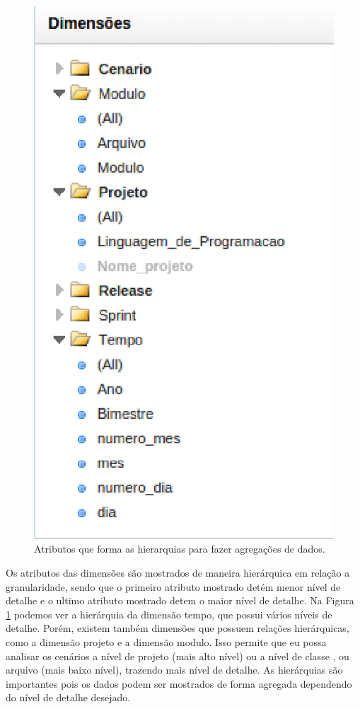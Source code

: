 \begin{figure}[H]
	\centering
	\includegraphics[scale=0.6]{figuras/dw-hierarquias}
	\caption{Atributos que forma as hierarquias para fazer agregações de dados.}
	\label{dw-hierarquias}
\end{figure}

Os atributos das dimensões são mostrados de maneira hierárquica em relação a granularidade, sendo que o primeiro atributo mostrado detém menor nível de detalhe e o ultimo atributo mostrado detem o maior nível de detalhe. Na Figura \ref{dw-hierarquias} podemos ver a hierárquia da dimensão tempo, que possui vários níveis de detalhe. Porém, existem também dimensões que possuem relações hierárquicas, como a dimensão projeto e a dimensão modulo. Isso permite que eu possa analisar os cenários a nível de projeto (mais alto nível) ou a nível de classe , ou arquivo (mais baixo nível), trazendo mais nível de detalhe. As hierárquias são importantes pois os dados podem ser mostrados de forma agregada dependendo do nível de detalhe desejado.


